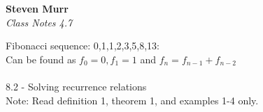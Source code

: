 \documentclass{article}
\begin{document}
\setcounter{totalnumber}{5}
   \begin{flushright}
      \Large\textbf{Steven Murr}\\
      \large\textit{Class Notes 4.7}
   \end{flushright}
\begin{flushleft}
\makeatletter%
\setlength{\@fptop}{5pt}
\makeatother

\setlength\parindent{0pt}Fibonacci sequence: 0,1,1,2,3,5,8,13: \\
Can be found as $f_0=0, f_1=1$ and $f_n = f_{n-1} + f_{n-2}$ \\

~\\
8.2 - Solving recurrence relations \\
Note: Read definition 1, theorem 1, and examples 1-4 only. \\


\end{flushleft}
\end{document}
